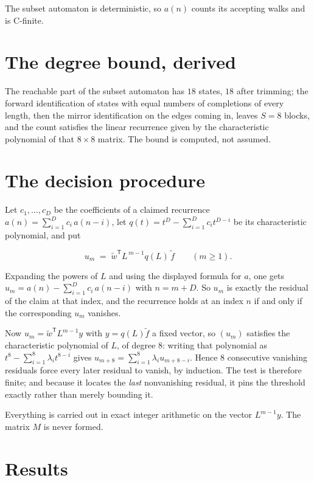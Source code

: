 \documentclass[11pt]{article}
\theoremstyle{definition}
\begin{document}
The subset automaton is deterministic, so $a(n)$ counts its accepting walks and is C-finite.

\section{The degree bound, derived}

The reachable part of the subset automaton has $18$ states, $18$ after trimming; the forward identification of states with equal numbers of completions of every length, then the mirror identification on the edges coming in, leaves $S = 8$ blocks, and the count satisfies the linear recurrence given by the characteristic polynomial of that $8\times8$ matrix. The bound is computed, not assumed.

\section{The decision procedure}

Let $c_1,\dots,c_D$ be the coefficients of a claimed recurrence $a(n) = \sum_{i=1}^{D} c_i\,a(n-i)$, let $q(t) = t^{D} - \sum_{i=1}^{D} c_i t^{D-i}$ be its characteristic polynomial, and put

\[u_m \;=\; \tilde w^{\mathsf T} L^{\,m-1} q(L)\,\tilde f \qquad (m \ge 1).\]

Expanding the powers of $L$ and using the displayed formula for $a$, one gets $u_m = a(n) - \sum_{i=1}^{D} c_i\,a(n-i)$ with $n = m + D$. So $u_m$ is exactly the residual of the claim at that index, and the recurrence holds at an index $n$ if and only if the corresponding $u_m$ vanishes.

Now $u_m = \tilde w^{\mathsf T} L^{m-1} y$ with $y = q(L)\tilde f$ a fixed vector, so $(u_m)$ satisfies the characteristic polynomial of $L$, of degree $8$: writing that polynomial as $t^{8} - \sum_{i=1}^{8} \lambda_i t^{8-i}$ gives $u_{m+8} = \sum_{i=1}^{8} \lambda_i u_{m+8-i}$. Hence $8$ consecutive vanishing residuals force every later residual to vanish, by induction. The test is therefore finite; and because it locates the {\itshape last} nonvanishing residual, it pins the threshold exactly rather than merely bounding it.

Everything is carried out in exact integer arithmetic on the vector $L^{m-1}y$. The matrix $M$ is never formed.

\section{Results}
\end{document}
